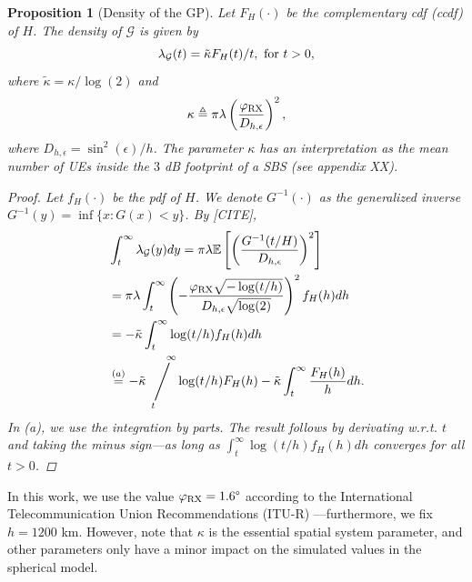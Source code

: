 \documentclass[lettersize,journal]{IEEEtran}
\newcommand{\viiva}{\mathop{\Bigg/}}
\newcommand{\sij}[3]{\viiva\limits_{\hspace*{-5mm}{#1}}^{\hspace*{5mm}{#2}}{#3}}
\newtheorem{prop}[theorem]{Proposition}
\begin{document}
\begin{prop}[Density of the GP]
  Let $F_H(\cdot)$ be the complementary cdf (ccdf) of $H$. The density of $\mathcal{G}$ is given by
  \begin{equation}
    \label{eq:GPdensity}
    \lambda_{\mathcal{G}}(t)= \tilde{\kappa}F_H(t)/t, \text{ \text{for} }t>0,
  \end{equation}
  where $\tilde{\kappa}= \kappa/\log(2)$ and
  \begin{equation}
    \label{eq:kappa}
          {\kappa} \triangleq    \pi \lambda   \left(\frac{\varphi_{\textup{RX}}}{D_{h,\epsilon}}\right)^2,
  \end{equation}
  where $D_{h,\epsilon}=\sin^2(\epsilon)/h$. The parameter $\kappa$ has an interpretation as the mean number of UEs inside the $3$ dB footprint of a SBS (see appendix XX).
  \begin{proof}
    Let $f_H(\cdot)$ be the pdf of $H$. We denote $G^{-1}(\cdot)$ as the generalized inverse $G^{-1}(y) = \inf \{x:G(x)<y\}$. By [CITE],
    \begin{align*}
      &\int_t^{\infty}\lambda_{\mathcal{G}}(y)dy \overset{}{=} \pi \lambda \mathbb{E}\left[ \left(\frac{G^{-1}(t/H)}{D_{h,\epsilon}}\right)^2 \right] \\
      &=\pi \lambda \int_t^{\infty} \left(-\frac{\varphi_{\text{RX}}\sqrt{-\log(t/h)}}{D_{h,\epsilon} \sqrt{\log(2)}}\right)^2f_H(h) dh  \\
      &= -\tilde{\kappa} \int_t^{\infty} \log(t/h)f_H(h) dh\\
      &\overset{(a)}{=} -\tilde{\kappa} \sij{t}{\infty} \log(t/h)F_H(h) - \tilde{\kappa} \int_t^{\infty}\frac{F_H(h)}{h} dh.
    \end{align*}
    In (a), we use the integration by parts. The result follows by derivating w.r.t. $t$ and taking the minus sign---as long as $\int_t^{\infty} \log(t/h)f_H(h) dh$ converges for all $t>0$.
  \end{proof}
\end{prop}
In this work, we use the value $\varphi_{\text{RX}} = 1.6 \degree$ according to the International Telecommunication Union Recommendations (ITU-R) \cite{ITURS1528}---furthermore, we fix $h=1200$ km. However, note that $\kappa$ is the essential spatial system parameter, and other parameters only have a minor impact on the simulated values in the spherical model.
\end{document}
